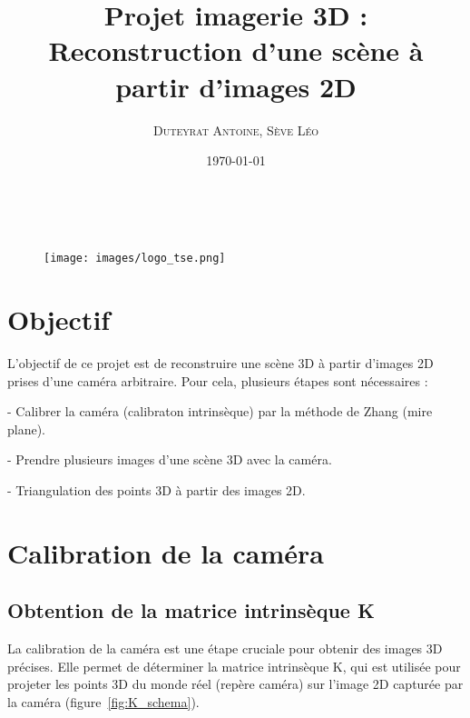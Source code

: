 \documentclass[12pt]{article}
\title{\textbf{Projet imagerie 3D : Reconstruction d'une scène à partir d'images 2D}}
\author{
    \textsc{Duteyrat Antoine},
    \textsc{Sève Léo}
}
\date{\today}
\makeatletter
\let\titre\@title
\let\auteurs\@author
\let\date\@date
\makeatother
\begin{document}
\begin{titlepage}
    \begin{center}
        \vskip 1.5cm
        {\color {couleur}{\huge \bf \titre}}\\[5mm]
        \vskip 0.5cm
        \begin{figure}[h]
        \centering
        \texttt{[image: images/logo\_tse.png]}
        \end{figure}
        \vskip 1cm
        {\large {\auteurs}}
        \vskip 0.5cm
        \vfill
        \vskip 0.2cm
        \date
      \end{center}
\end{titlepage}
\clearpage

\tableofcontents

\newpage

\section{Objectif}

L'objectif de ce projet est de reconstruire une scène 3D à partir d'images 2D prises d'une caméra arbitraire.
Pour cela, plusieurs étapes sont nécessaires :

- Calibrer la caméra (calibraton intrinsèque) par la méthode de Zhang (mire plane).

- Prendre plusieurs images d'une scène 3D avec la caméra.

- Triangulation des points 3D à partir des images 2D.

\newpage

\section{Calibration de la caméra}

\subsection{Obtention de la matrice intrinsèque K}

La calibration de la caméra est une étape cruciale pour obtenir des images 3D précises.
Elle permet de déterminer la matrice intrinsèque K, qui est utilisée pour projeter les points 3D du monde réel (repère caméra) sur l'image 2D capturée par la caméra (figure~\ref{fig:K_schema}).
\end{document}
